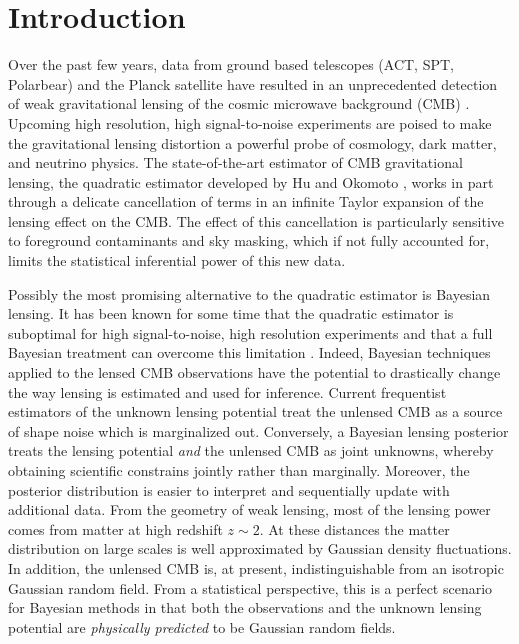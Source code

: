 \documentclass[iop,revtex4,apj,onecolumn]{emulateapj}
\begin{document}
\section{Introduction}
 Over the past few years, data from ground based telescopes (ACT, SPT, Polarbear) and the Planck satellite have resulted in an unprecedented detection of weak gravitational lensing of the cosmic microwave background (CMB) \citep{das2011detection,van2012measurement,planck2013lensing,Polarbear2014,planck2015lensing}.  Upcoming high resolution, high signal-to-noise experiments are poised to    make the gravitational lensing distortion  a  powerful probe of cosmology, dark matter, and neutrino physics. The state-of-the-art estimator of CMB gravitational lensing, the quadratic estimator developed by Hu and Okomoto \citep{hu2001mapping,hu2002mass}, works in part through a delicate cancellation of terms in an infinite Taylor expansion of the lensing effect on the CMB. The effect of this cancellation is particularly sensitive to foreground contaminants and sky masking, which  if not fully accounted for,  limits  the statistical inferential power of this new data.  

 Possibly the most promising alternative to the quadratic estimator is Bayesian lensing. It has been known for some time that the quadratic estimator is suboptimal for high signal-to-noise, high resolution experiments and that a full Bayesian treatment can overcome this limitation
 \citep{HirataSeljak1, HirataSeljak2}. Indeed, Bayesian techniques applied to the lensed CMB observations have the potential to drastically change the way lensing is estimated and used for inference.  Current frequentist estimators of the unknown lensing potential treat the unlensed CMB as a source of shape noise which is marginalized out. Conversely, a Bayesian lensing posterior treats the lensing potential {\em and} the unlensed CMB as joint unknowns, whereby obtaining scientific constrains jointly rather than marginally. Moreover, the  posterior distribution is easier to interpret and sequentially update with additional data. From the geometry of weak lensing, most of the lensing power comes from matter at high redshift $z\sim 2$. At these distances the matter distribution on large scales is well approximated by Gaussian density fluctuations. In addition, the unlensed CMB is, at present, indistinguishable from an isotropic Gaussian random field.  From a statistical perspective, this is a perfect scenario for Bayesian methods in that both the observations and the unknown lensing potential are {\em physically predicted} to be Gaussian random fields.
 
\end{document}
